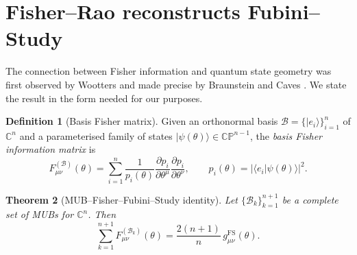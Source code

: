 \documentclass[12pt,a4paper]{article}
\newtheorem{theorem}{Theorem}[section]
\theoremstyle{definition}
\newtheorem{definition}[theorem]{Definition}
\newcommand{\C}{\mathbb{C}}
\newcommand{\CP}{\mathbb{CP}}
\newcommand{\Bcal}{\mathcal{B}}
\newcommand{\ket}[1]{| #1 \rangle}
\begin{document}
\section{Fisher--Rao reconstructs Fubini--Study}
\label{sec:fisher-fubini}

The connection between Fisher information and quantum state geometry
was first observed by Wootters \cite{Wootters1981} and made precise by
Braunstein and Caves \cite{BraunsteinCaves1994}. We state the result in the
form needed for our purposes.

\begin{definition}[Basis Fisher matrix]
  \label{def:basis-fisher}
  Given an orthonormal basis $\Bcal = \{\ket{e_i}\}_{i=1}^n$ of
  $\C^n$ and a parameterised family of states
  $\ket{\psi(\theta)} \in \CP^{n-1}$, the \emph{basis Fisher
  information matrix} is
  \begin{equation}
    F^{(\Bcal)}_{\mu\nu}(\theta)
    = \sum_{i=1}^n
      \frac{1}{p_i(\theta)}
      \frac{\partial p_i}{\partial\theta^\mu}
      \frac{\partial p_i}{\partial\theta^\nu},
    \qquad
    p_i(\theta) = |\langle e_i | \psi(\theta)\rangle|^2.
  \end{equation}
\end{definition}

\begin{theorem}[MUB--Fisher--Fubini--Study identity]
  \label{thm:fisher-fubini}
  Let $\{\Bcal_k\}_{k=1}^{n+1}$ be a complete set of MUBs for $\C^n$.
  Then
  \begin{equation}
    \label{eq:mub-sum}
    \sum_{k=1}^{n+1} F^{(\Bcal_k)}_{\mu\nu}(\theta)
    = \frac{2(n+1)}{n}\, g^{\mathrm{FS}}_{\mu\nu}(\theta).
  \end{equation}
\end{theorem}
\end{document}
